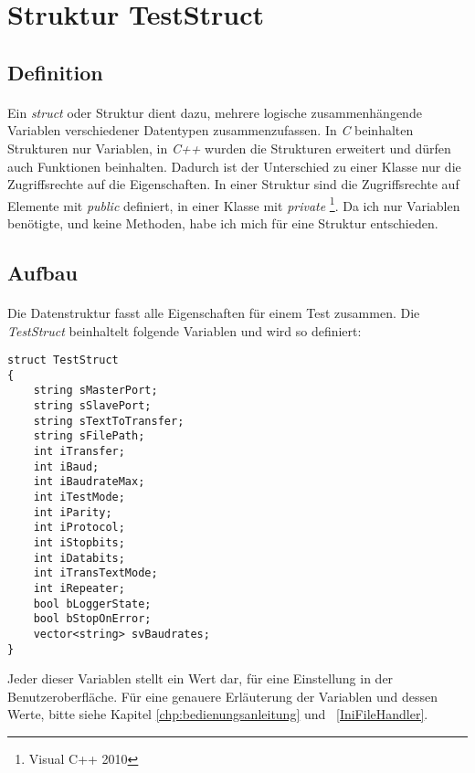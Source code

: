 \section{Struktur TestStruct}\label{TestStruct}
\subsection{Definition}
\paragraph{}
Ein \textit{struct} oder Struktur dient dazu, mehrere logische zusammenhängende Variablen verschiedener Datentypen zusammenzufassen. In \textit{C} beinhalten Strukturen nur Variablen, in \textit{C++} wurden die Strukturen erweitert und dürfen auch Funktionen beinhalten. Dadurch ist der Unterschied zu einer Klasse nur die Zugriffsrechte auf die Eigenschaften. In einer Struktur sind die Zugriffsrechte auf Elemente mit  \textit{public} definiert, in einer Klasse mit \textit{private} \footnote{Visual C++ 2010}. Da ich nur Variablen benötigte, und keine Methoden, habe ich mich für eine Struktur entschieden.


\subsection{Aufbau}
\paragraph{}
Die Datenstruktur fasst alle Eigenschaften für einem Test zusammen. Die \textit{TestStruct} beinhaltelt folgende Variablen und wird so definiert:\\

\begin{lstlisting}	 
struct TestStruct
{
	string sMasterPort;
	string sSlavePort;
	string sTextToTransfer;
	string sFilePath;
	int iTransfer;
	int iBaud;
	int iBaudrateMax;
	int iTestMode;
	int iParity;
	int iProtocol;
	int iStopbits;
	int iDatabits;
	int iTransTextMode;
	int iRepeater;
	bool bLoggerState;
	bool bStopOnError;
	vector<string> svBaudrates;
}
\end{lstlisting}

Jeder dieser Variablen stellt ein Wert dar, für eine Einstellung in der Benutzeroberfläche. Für eine genauere Erläuterung der Variablen und dessen Werte, bitte siehe Kapitel \ref{chp:bedienungsanleitung} und ~\ref{IniFileHandler}.

\newpage



